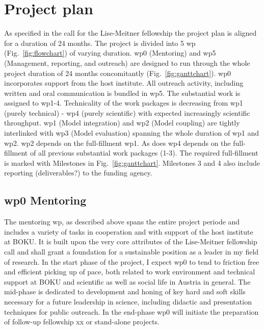 \section*{Project plan}
\label{sec:project_plan}

As specified in the call for the Lise-Meitner fellowship the project plan is aligned for a duration of 24 months. The project is divided into 5 \gls{wp} (Fig.~\ref{fig:flowchart}) of varying duration. \gls{wp}0 (Mentoring) and \gls{wp}5 (Management, reporting, and outreach) are designed to run through the whole project duration of 24 months concomitantly (Fig.~\ref{fig:ganttchart}). \gls{wp}0 incorporates support from the host institute. All outreach activity, including written and oral communication  is bundled in \gls{wp}5. The substantial work is assigned to \gls{wp}1-4. Technicality of the work packages is decreasing from \gls{wp}1 (purely technical) - \gls{wp}4 (purely scientific) with expected increasingly scientific throughput. \gls{wp}1 (Model integration) and \gls{wp}2 (Model coupling) are tightly interlinked with \gls{wp}3 (Model evaluation) spanning the whole duration of \gls{wp}1 and \gls{wp}2. \gls{wp}2 depends on the full-fillment \gls{wp}1. As does \gls{wp}4 depends on the full-fillment of all previous substantial work packages (1-3). The required full-fillment is marked with Milestones in Fig.~\ref{fig:ganttchart}. Milestones 3 and 4 also include reporting (deliverables?) to the funding agency.
 
\subsection*{\gls{wp}0 Mentoring}
\label{ssec:wp0}
The mentoring \gls{wp}, as described above spans the entire project periode and includes a variety of tasks in cooperation and with support of the host institute at BOKU. It is built upon the very core attributes of the Lise-Meitner fellowship call and shall grant a foundation for a sustainable position as a leader in my field of research. In the start phase of the project, I expect \gls{wp}0 to tend to friction free and efficient picking up of pace, both related to work environment and technical support at BOKU and scientific as well as social life in Austria in general. The mid-phase is dedicated to development and honing of key hard and soft skills necessary for a future leadership in science, including didactic and presentation techniques for public outreach. In the end-phase \gls{wp}0 will initiate the preparation of follow-up fellowship xx or stand-alone projects.\\

